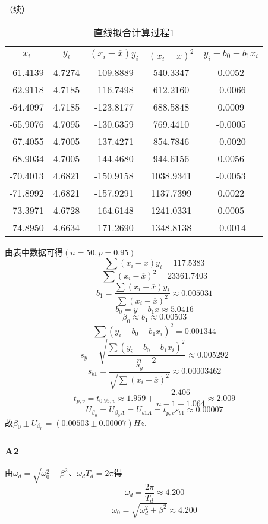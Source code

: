 \documentclass[12pt,a4paper,oneside,left=3.18,right=3.18,top=2.54,bottom=2.54]{ctexart}
\begin{document}
			（续）
			\begin{table}[H]
			\centering
			\begin{tabular}{|c|c|c|c||c|}
			\hline
			$x_i$&$y_i$&$(x_i-\overline{x})y_i$&$(x_i-\overline{x})^2$&$y_i-b_0-b_1x_i$\\
			\hline
			-61.4139&4.7274&-109.8889&540.3347&0.0052\\
			\hline
			-62.9118&4.7185&-116.7498&612.2160&-0.0066\\
			\hline
			-64.4097&4.7185&-123.8177&688.5848&0.0009\\
			\hline
			-65.9076&4.7095&-130.6359&769.4410&-0.0005\\
			\hline
			-67.4055&4.7005&-137.4271&854.7846&-0.0020\\
			\hline
			-68.9034&4.7005&-144.4680&944.6156&0.0056\\
			\hline
			-70.4013&4.6821&-150.9158&1038.9341&-0.0053\\
			\hline
			-71.8992&4.6821&-157.9291&1137.7399&0.0022\\
			\hline
			-73.3971&4.6728&-164.6148&1241.0331&0.0005\\
			\hline
			-74.8950&4.6634&-171.2690&1348.8138&-0.0014\\
			\hline
			\end{tabular}
			\caption{直线拟合计算过程1}
			\end{table}
			由表中数据可得$(n=50,p=0.95)$
			$$\sum{(x_i-\overline{x})y_i}=117.5383$$
			$$\sum{(x_i-\overline{x})^2}=23361.7403$$
			$$b_1=\dfrac{\sum{(x_i-\overline{x})y_i}}{\sum{(x_i-\overline{x})^2}}\approx0.005031$$
			$$b_0=\overline{y}-b_1\overline{x}\approx5.0416$$
			$$\beta_0\approx b_1\approx0.00503$$
			$$\sum{(y_i-b_0-b_1x_i)^2}=0.001344$$
			$$s_y=\sqrt{\dfrac{\sum{(y_i-b_0-b_1x_i)^2}}{n-2}}\approx0.005292$$
			$$s_{b1}=\dfrac{s_y}{\sqrt{\sum{(x_i-\overline{x})^2}}}\approx0.00003462$$
			$$t_{p,v}=t_{0.95,v}\approx1.959+\dfrac{2.406}{n-1-1.064}\approx2.009$$
			$$U_{\beta_0}=U_{\beta_0A}=U_{b1A}=t_{p,v}s_{b1}\approx0.00007$$
			故$\beta_0\pm U_{\beta_0}=(0.00503\pm0.00007)Hz$.
		\subsubsection{A2}
			由$\omega_d=\sqrt{\omega_0^2-\beta^2}$、$\omega_dT_d=2\pi$得
			$$\omega_d=\dfrac{2\pi}{T_d}\approx4.200$$
			$$\omega_0=\sqrt{\omega_d^2+\beta^2}\approx4.200$$
\end{document}
